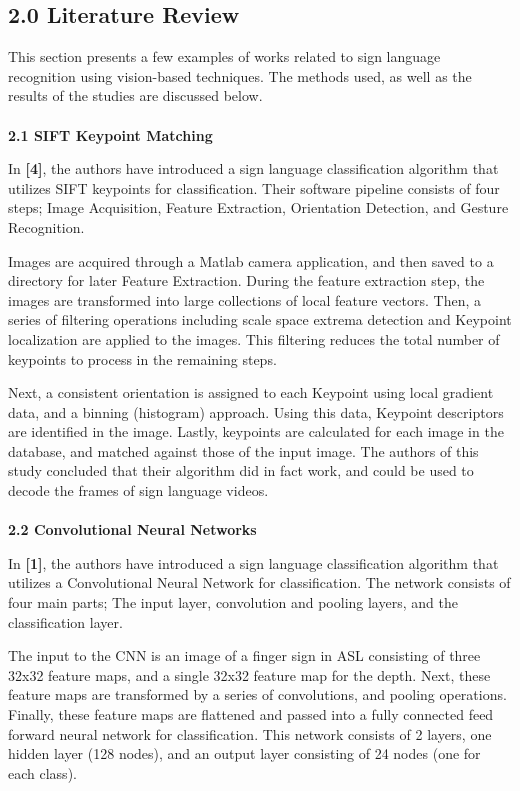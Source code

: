 \documentclass[11pt]{article}
\begin{document}
\begin{multicols}{2}
\subsection*{2.0 Literature Review}
This section presents a few examples of works related to sign language recognition using vision-based techniques.  The methods used, as well as the results of the studies are discussed below. \\ \\
\textbf{2.1 SIFT Keypoint Matching}
\par
In \textbf{[4]}, the authors have introduced a sign language classification algorithm that utilizes SIFT keypoints for classification.  Their software pipeline consists of four steps; Image Acquisition, Feature Extraction, Orientation Detection, and Gesture Recognition.  
\par
Images are acquired through a Matlab camera application, and then saved to a directory for later Feature Extraction.  During the feature extraction step, the images are transformed into large collections of local feature vectors.  Then, a series of filtering operations including scale space extrema detection and Keypoint localization are applied to the images.  This filtering reduces the total number of keypoints to process in the remaining steps.  
\par
Next, a consistent orientation is assigned to each Keypoint using local gradient data, and a binning (histogram) approach.  Using this data, Keypoint descriptors are identified in the image.  Lastly, keypoints are calculated for each image in the database, and matched against those of the input image.  The authors of this study concluded that their algorithm did in fact work, and could be used to decode the frames of sign language videos.
\\ \\
\textbf{2.2 Convolutional Neural Networks}
\par
In \textbf{[1]}, the authors have introduced a sign language classification algorithm that utilizes a Convolutional Neural Network for classification.  The network consists of four main parts; The input layer, convolution and pooling layers, and the classification layer.
\par
The input to the CNN is an image of a finger sign in ASL consisting of three 32x32 feature maps, and a single 32x32 feature map for the depth.  Next, these feature maps are transformed by a series of convolutions, and pooling operations.  Finally, these feature maps are flattened and passed into a fully connected feed forward neural network for classification.  This network consists of 2 layers, one hidden layer (128 nodes), and an output layer consisting of 24 nodes (one for each class).


\end{multicols}
\end{document}
